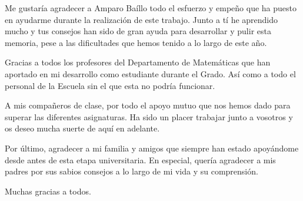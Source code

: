 Me gustaría agradecer a Amparo Baíllo todo el esfuerzo y empeño que ha puesto en ayudarme durante la realización de este trabajo. Junto a tí he aprendido mucho y tus consejos han sido de gran ayuda para desarrollar y pulir esta memoria, pese a las dificultades que hemos tenido a lo largo de este año.

Gracias a todos los profesores del Departamento de Matemáticas que han aportado en mi desarrollo como estudiante durante el Grado. Así como a todo el personal de la Escuela sin el que esta no podría funcionar.

A mis compañeros de clase, por todo el apoyo mutuo que nos hemos dado para superar las diferentes asignaturas. Ha sido un placer trabajar junto a vosotros y os deseo mucha suerte de aquí en adelante.

Por último, agradecer a mi familia y amigos que siempre han estado apoyándome desde antes de esta etapa universitaria. En especial, quería agradecer a mis padres por sus sabios consejos a lo largo de mi vida y su comprensión.

Muchas gracias a todos.